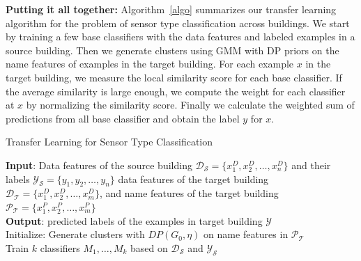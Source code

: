 {\bf Putting it all together:} Algorithm~\ref{algo} summarizes our transfer learning algorithm for the problem of sensor type classification across buildings.
We start by training a few base classifiers with the data features and labeled examples in a source building. Then we generate clusters using GMM with DP priors on the name features of examples in the target building. For each example $x$ in the target building, we measure the local similarity score for each base classifier. If the average similarity is large enough, we compute the weight for each classifier at $x$ by normalizing the similarity score. Finally we calculate the weighted sum of predictions from all base classifier and obtain the label $y$ for $x$.

\begin{algorithm}[ht]
 \caption{Transfer Learning for Sensor Type Classification}
 \label{algo}
 {\bf Input}: Data features of the source building $\mathcal{D_S}=\{x^D_1,x^D_2,\dots,x^D_n\}$ and their labels $\mathcal{Y_S}=\{y_1,y_2,\dots,y_n\}$ data features of the target building $\mathcal{D_T}=\{x^D_1,x^D_2,\dots,x^D_m\}$, and name features of the target building $\mathcal{P_T}=\{x^P_1,x^P_2,\dots,x^P_m\}$\\
 {\bf Output}: predicted labels of the examples in target building $\mathcal{Y}$\\
 Initialize: Generate clusters with $DP(G_{0}, \eta)$ on name features in $\mathcal{P_T}$\\
 Train $k$ classifiers $M_1, \dots, M_k$ based on $\mathcal{D_S}$ and $\mathcal{Y_S}$\;

\end{algorithm}
